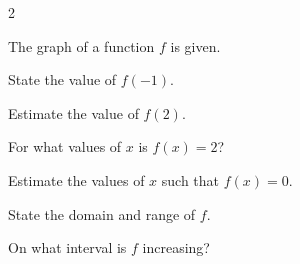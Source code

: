 \documentclass{sebase}
\begin{document}
\begin{multicols}{2}
%

\begin{ExerciseList}
\item[$\hfill $1.] The graph of a function $f$ is given.\vspace{-3pt}

\begin{ExerciseList}
\item[(a)] State the value of $f(-1)$.

%

\item[(b)] Estimate the value of $f(2)$.

%

\item[(c)] For what values of $x$ is $f(x)=2$?

%

\item[(d)] Estimate the values of $x$ such that $f(x)=0$.

%

\item[(e)] State the domain and range of $f$.

%

\item[(f)] On what interval is $f$ increasing?

%
\end{ExerciseList}


\end{ExerciseList}
\end{multicols}
\end{document}
